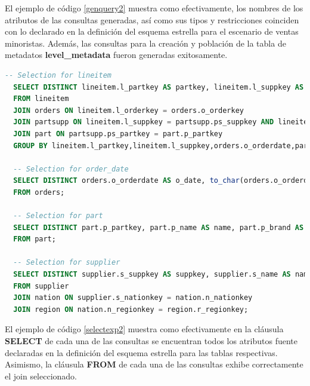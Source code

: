 El ejemplo de c\'odigo \ref{genquery2} muestra como efectivamente, los nombres de los atributos 
de las consultas generadas, as\'i como sus tipos y restricciones coinciden con lo declarado en la definición 
del esquema estrella para el escenario de ventas minoristas. Además, las consultas para la creación y 
población de la tabla de metadatos \textbf{level\_metadata} fueron generadas exitosamente.

\begin{lstlisting}[label={selectexp2}, caption={Consultas de selecci\'on generadas para el experimento 2}, language={sql}]
  -- Selection for lineitem
  SELECT DISTINCT lineitem.l_partkey AS partkey, lineitem.l_suppkey AS supplierkey, orders.o_orderdate AS order_date, SUM(lineitem.l_payment) AS totalpayment, SUM(lineitem.l_quantity) AS totalquantity, SUM(lineitem.l_payment)-(SUM(lineitem.l_quantity)*partsupp.ps_supplycost)-(SUM(lineitem.l_quantity)*part.p_retailprice) AS earnings
  FROM lineitem
  JOIN orders ON lineitem.l_orderkey = orders.o_orderkey
  JOIN partsupp ON lineitem.l_suppkey = partsupp.ps_suppkey AND lineitem.l_partkey = partsupp.ps_partkey
  JOIN part ON partsupp.ps_partkey = part.p_partkey
  GROUP BY lineitem.l_partkey,lineitem.l_suppkey,orders.o_orderdate,partsupp.ps_supplycost,part.p_retailprice;

  -- Selection for order_date
  SELECT DISTINCT orders.o_orderdate AS o_date, to_char(orders.o_orderdate, 'Day') AS day, to_char(orders.o_orderdate, 'Month') AS month
  FROM orders;

  -- Selection for part 
  SELECT DISTINCT part.p_partkey, part.p_name AS name, part.p_brand AS brand, part.p_size, part.p_retailprice
  FROM part;

  -- Selection for supplier 
  SELECT DISTINCT supplier.s_suppkey AS suppkey, supplier.s_name AS name, supplier.s_phone AS phone, supplier.s_address AS address, nation.n_name AS nation, region.r_name AS region
  FROM supplier
  JOIN nation ON supplier.s_nationkey = nation.n_nationkey
  JOIN region ON nation.n_regionkey = region.r_regionkey;
\end{lstlisting}

El ejemplo de c\'odigo \ref{selectexp2} muestra como efectivamente en la cl\'ausula \textbf{SELECT} 
de cada una de las consultas se encuentran todos los atributos fuente declaradas en la definición 
del esquema estrella para las tablas respectivas. Asimismo, la cl\'ausula \textbf{FROM} de cada 
una de las consultas exhibe correctamente  el join seleccionado.

